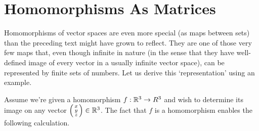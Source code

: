 \section{Homomorphisms As Matrices}
\label{sec:homomorphisms-as-matrices}

Homomorphisms of vector spaces are even more special (as maps between sets) than
the preceding text might have grown to reflect. They are one of those very few
maps that, even though infinite in nature (in the sense that they have
well-defined image of every vector in a usually infinite vector space), can be
represented by finite sets of numbers. Let us derive this `representation' using
an example.

Assume we're given a homomorphism $f:\mathbb{R}^3 \to R^3$ and wish to determine its
image on any vector $\begin{psmallmatrix} x \\ y \\ z \end{psmallmatrix} \in
\mathbb{R}^3$. The fact that $f$ is a homomorphism enables the following calculation.
